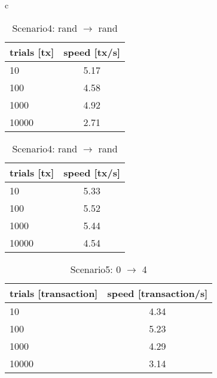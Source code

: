 \documentclass[a4j,11pt,uplatex,onecolumn]{article}
\begin{document}
\begin{table}[htbp]
    \begin{center}
        \begin{tabular}{c}

            \begin{minipage}{0.5\hsize}
                \begin{center}
                    \caption{Scenario3: 0 $\rightleftarrows$ 1, 2 $\rightleftarrows$ 3}
                    \begin{tabular}{|l|c|} \hline
                        trials [tx] & speed [tx/s]\\ \hline \hline
                        10 & 5.17 \\
                        100 & 4.58 \\
                        1000 & 4.92 \\
                        10000 & 2.71 \\ \hline
                    \end{tabular}
                \end{center}
            \end{minipage}

            \begin{minipage}{0.5\hsize}
                \begin{center}
                    \caption{Scenario4: rand $\rightarrow$ rand}
                    \begin{tabular}{|l|c|} \hline
                        trials [tx] & speed [tx/s]\\ \hline \hline
                        10 & 5.33 \\
                        100 & 5.52 \\
                        1000 & 5.44 \\
                        10000 & 4.54 \\ \hline
                    \end{tabular}
                \end{center}
            \end{minipage}

        \end{tabular}
    \end{center}
\end{table}

\begin{table}[htb]
  \begin{center}
    \caption{Scenario5: 0 $\rightarrow$ 4}
    \begin{tabular}{|l|c|} \hline
        trials [transaction] & speed [transaction/s]\\ \hline \hline
        10 & 4.34 \\
        100 & 5.23 \\
        1000 & 4.29 \\
        10000 & 3.14 \\ \hline
    \end{tabular}
  \end{center}
\end{table}
\end{document}

